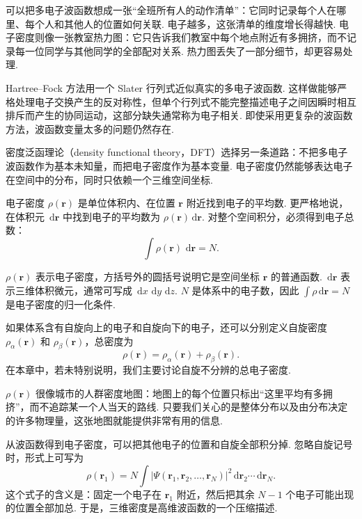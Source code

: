 \documentclass[UTF8,11pt,a4paper,openany]{ctexbook}
\newcommand{\dd}{\,\mathrm d}\newcommand{\Ham}{\hat H}\newcommand{\tr}{\operatorname{Tr}}
\begin{document}
\begin{analogybox}
可以把多电子波函数想成一张“全班所有人的动作清单”：它同时记录每个人在哪里、每个人和其他人的位置如何关联. 电子越多，这张清单的维度增长得越快. 电子密度则像一张教室热力图：它只告诉我们教室中每个地点附近有多拥挤，而不记录每一位同学与其他同学的全部配对关系. 热力图丢失了一部分细节，却更容易处理. 
\end{analogybox}

Hartree--Fock 方法用一个 Slater 行列式近似真实的多电子波函数. 这样做能够严格处理电子交换产生的反对称性，但单个行列式不能完整描述电子之间因瞬时相互排斥而产生的协同运动，这部分缺失通常称为电子相关. 即使采用更复杂的波函数方法，波函数变量太多的问题仍然存在. 

密度泛函理论（density functional theory，DFT）选择另一条道路：不把多电子波函数作为基本未知量，而把电子密度作为基本变量. 电子密度仍然能够表达电子在空间中的分布，同时只依赖一个三维空间坐标. 

\begin{definitionbox}
电子密度 $\rho(\mathbf r)$ 是单位体积内、在位置 $\mathbf r$ 附近找到电子的平均数. 更严格地说，在体积元 $\dd\mathbf r$ 中找到电子的平均数为 $\rho(\mathbf r)\dd\mathbf r$. 对整个空间积分，必须得到电子总数：
\[
\int \rho(\mathbf r)\,\dd\mathbf r=N.
\]
\end{definitionbox}

\begin{notationbox}
$\rho(\mathbf r)$ 表示电子密度，方括号外的圆括号说明它是空间坐标 $\mathbf r$ 的普通函数. $\dd\mathbf r$ 表示三维体积微元，通常可写成 $\dd x\,\dd y\,\dd z$. $N$ 是体系中的电子数，因此 $\int\rho\dd\mathbf r=N$ 是电子密度的归一化条件. 
\end{notationbox}

如果体系含有自旋向上的电子和自旋向下的电子，还可以分别定义自旋密度 $\rho_\alpha(\mathbf r)$ 和 $\rho_\beta(\mathbf r)$，总密度为
\[
\rho(\mathbf r)=\rho_\alpha(\mathbf r)+\rho_\beta(\mathbf r).
\]
在本章中，若未特别说明，我们主要讨论自旋不分辨的总电子密度. 

\begin{analogybox}
$\rho(\mathbf r)$ 很像城市的人群密度地图：地图上的每个位置只标出“这里平均有多拥挤”，而不追踪某一个人当天的路线. 只要我们关心的是整体分布以及由分布决定的许多物理量，这张地图就能提供非常有用的信息. 
\end{analogybox}

从波函数得到电子密度，可以把其他电子的位置和自旋全部积分掉. 忽略自旋记号时，形式上可写为
\[
\rho(\mathbf r_1)
=
N\int
\left|\Psi(\mathbf r_1,\mathbf r_2,\ldots,\mathbf r_N)\right|^2
\dd\mathbf r_2\cdots\dd\mathbf r_N.
\]
这个式子的含义是：固定一个电子在 $\mathbf r_1$ 附近，然后把其余 $N-1$ 个电子可能出现的位置全部加总. 于是，三维密度是高维波函数的一个压缩描述. 
\end{document}
